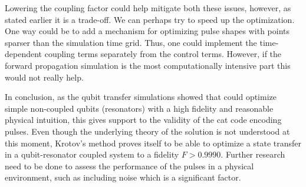 \documentclass[main.tex]{subfiles}
\begin{document}
Lowering the coupling factor could help mitigate both these issues, however, as stated earlier it is a trade-off.
We can perhaps try to speed up the optimization.
One way could be to add a mechanism for optimizing pulse shapes with points sparser than the simulation time grid.
Thus, one could implement the time-dependent coupling terms separately from the control terms.
However, if the forward propagation simulation is the most computationally intensive part this would not really help.

In conclusion, as the qubit transfer simulations showed that \krotov{} could optimize simple non-coupled qubits (resonators) with a high fidelity and reasonable physical intuition, this gives support to the validity of the cat code encoding pulses.
Even though the underlying theory of the solution is not understood at this moment, Krotov's method proves itself to be able to optimize a state transfer in a qubit-resonator coupled system to a fidelity \(F > 0.9990\).
Further research need to be done to assess the performance of the pulses in a physical environment, such as including noise which is a significant factor.
\end{document}
